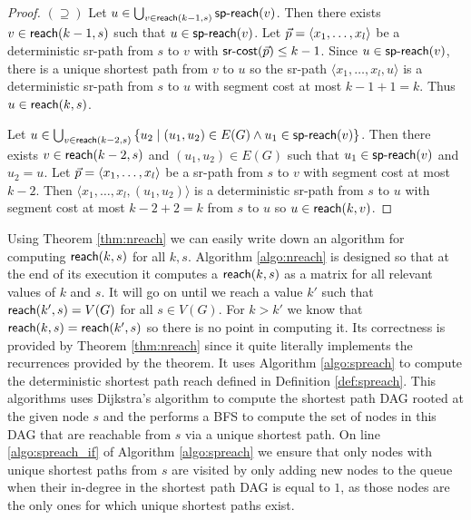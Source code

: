 \begin{proof}
$(\supseteq)$
Let $u \in \bigcup_{v \in \textsf{reach}(k - 1, s)} \textsf{sp-reach}(v)$. Then there exists $v \in \textsf{reach}(k - 1, s)$
such that $u \in \textsf{sp-reach}(v)$. Let $\vec{p} = \langle x_1, \ldots, x_l \rangle$ be a deterministic sr-path from $s$ to $v$ with
$\textsf{sr-cost}(\vec{p}) \leq k - 1$. Since $u \in \textsf{sp-reach}(v)$, there is a unique shortest path from $v$ to $u$ so the
sr-path $\langle x_1, \ldots, x_l, u \rangle$ is a deterministic sr-path from $s$ to $u$ with segment cost
at most $k - 1 + 1 = k$. Thus $u \in \textsf{reach}(k, s)$.

Let $u \in \bigcup_{v \in \textsf{reach}(k - 2, s)}  \left\{ u_2 \mid (u_1, u_2) \in E(G) \wedge u_1 \in \textsf{sp-reach}(v) \right\}$. 
Then there exists $v \in \textsf{reach}(k - 2, s)$ and $(u_1, u_2) \in E(G)$ such that $u_1 \in \textsf{sp-reach}(v)$ and
$u_2 = u$. Let $\vec{p} = \langle x_1, \ldots, x_l \rangle$ be a sr-path from $s$ to $v$ with segment
cost at most $k - 2$. Then $\langle x_1, \ldots, x_l, (u_1, u_2) \rangle$ is a deterministic sr-path from $s$ to $u$ with
segment cost at most $k - 2 + 2 = k$ from $s$ to $u$ so $u \in \textsf{reach}(k, v)$.
\end{proof}

Using Theorem \ref{thm:nreach} we can easily write down an algorithm for computing $\textsf{reach}(k, s)$ for all $k, s$.
Algorithm \ref{algo:nreach} is designed so that at the end of its execution it computes a
$\textsf{reach}(k, s)$ as a matrix for all relevant values of $k$ and $s$. It will go on until we reach a value
$k'$ such that $\textsf{reach}(k', s) = V(G)$ for all $s \in V(G)$. For $k > k'$ we know that $\textsf{reach}(k, s) = \textsf{reach}(k', s)$
so there is no point in computing it. Its correctness is provided by Theorem \ref{thm:nreach} since it quite literally
implements the recurrences provided by the theorem. It uses Algorithm \ref{algo:spreach} to compute the deterministic
shortest path reach defined in Definition \ref{def:spreach}. This algorithms uses Dijkstra's algorithm to compute the shortest path
DAG rooted at the given node $s$ and the performs a BFS to compute the set of nodes in this DAG that are reachable 
from $s$ via a unique shortest path. On line \ref{algo:spreach_if} of Algorithm \ref{algo:spreach} we ensure that only nodes with unique shortest paths from $s$ are visited by
only adding new nodes to the queue when their in-degree in the shortest path DAG is equal to $1$, as those nodes are the only
ones for which unique shortest paths exist.

